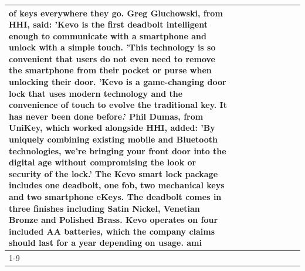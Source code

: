 \begin{table}[H]
\begin{tabular}{lllrlllll}
of keys everywhere they go. Greg Gluchowski, from HHI, said: 'Kevo is the first deadbolt intelligent enough to communicate with a smartphone and unlock with a simple touch. 'This technology is so convenient that users do not even need to remove the smartphone from their pocket or purse when unlocking their door. 'Kevo is a game-changing door lock that uses modern technology and the convenience of touch to evolve the traditional key. It has never been done before.' Phil Dumas, from UniKey, which worked alongside HHI, added: 'By uniquely combining existing mobile and Bluetooth technologies, we’re bringing your front door into the digital age without compromising the look or security of the lock.' The Kevo smart lock package includes one deadbolt, one fob, two mechanical keys and two smartphone eKeys. The deadbolt comes in three finishes including Satin Nickel, Venetian Bronze and Polished Brass. Kevo operates on four included AA batteries, which the company claims should last for a year depending on usage. ami \\
\cline{1-9}

\end{tabular}
\end{table}
